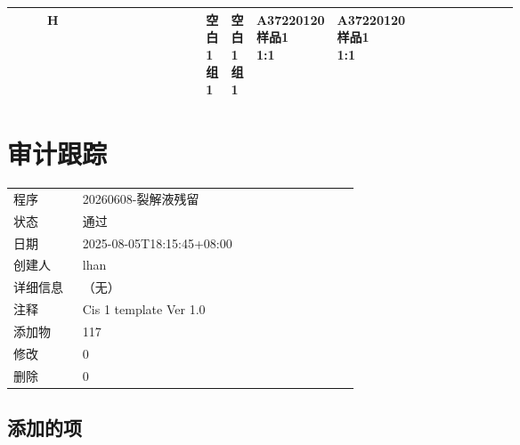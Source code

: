 \documentclass[UTF8,10pt,a4paper,fontset=fandol]{ctexart}
\newcommand{\fieldvalue}[1]{#1}
\begin{document}
\begin{center}
\begin{tabular}{c|*{12}{p{0.055\linewidth}|}}
H & & & & &
\shortstack{空白1\\组1} &
\shortstack{空白1\\组1} &
\shortstack{A37220120\\样品1\\1:1} &
\shortstack{A37220120\\样品1\\1:1} & & & & \\ \hline
\end{tabular}
\end{center}

\section*{审计跟踪}

\begin{tabular}{@{}p{0.18\linewidth}p{0.72\linewidth}@{}}
程序 & 
\fieldvalue{20260608-裂解液残留}\\
状态 &
\fieldvalue{通过}\\
日期 &
\fieldvalue{2025-08-05T18:15:45+08:00}\\
创建人 &
\fieldvalue{lhan}\\
详细信息 & （无）\\
注释 & Cis 1 template Ver 1.0\\
添加物 &
\fieldvalue{117}\\
修改 &
\fieldvalue{0}\\
删除 &
\fieldvalue{0}\\
\end{tabular}

\subsection*{添加的项}
\end{document}
